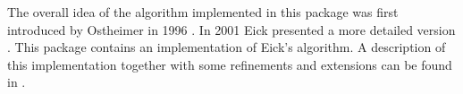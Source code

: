 The overall idea of the algorithm implemented in this package was
first introduced 
by Ostheimer in 1996 \cite{Ostheimer}. 
In 2001 Eick presented a more detailed
version \cite{Eick}. This package contains an implementation of Eick's
algorithm. A description of this implementation together with some
refinements and extensions can be
found in \cite{Assmann}. 







